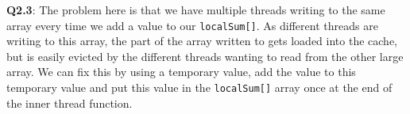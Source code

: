 \documentclass[10pt,a4paper]{article}
\begin{document}
\textbf{Q2.3}: The problem here is that we have multiple threads writing to the same
array every time we add a value to our \texttt{localSum[]}. As different threads
are writing to this array, the part of the array written to gets loaded into
the cache, but is easily evicted by the different threads wanting to read from the other large array. We can fix this by using a temporary value, add the value to this temporary value and put this value in the \texttt{localSum[]} array once at the end of the inner thread function.
\end{document}
